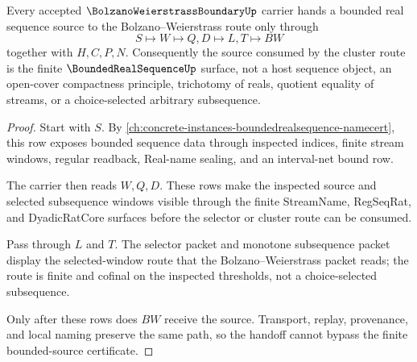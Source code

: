 \begin{theorem}
\label{thm:bolzano-weierstrass-boundary-source-handoff}
Every accepted $\BolzanoWeierstrassBoundaryUp$ carrier hands a bounded real sequence source to the Bolzano--Weierstrass route only through
$$
S\longmapsto W\longmapsto Q,D\longmapsto L,T\longmapsto BW
$$
together with $H,C,P,N$. Consequently the source consumed by the cluster route is the finite $\BoundedRealSequenceUp$ surface, not a host sequence object, an open-cover compactness principle, trichotomy of reals, quotient equality of streams, or a choice-selected arbitrary subsequence.
\end{theorem}
\begin{proof}
Start with $S$. By \autoref{ch:concrete-instances-boundedrealsequence-namecert}, this row exposes bounded sequence data through inspected indices, finite stream windows, regular readback, Real-name sealing, and an interval-net bound row.

The carrier then reads $W,Q,D$. These rows make the inspected source and selected subsequence windows visible through the finite StreamName, RegSeqRat, and DyadicRatCore surfaces before the selector or cluster route can be consumed.

Pass through $L$ and $T$. The selector packet and monotone subsequence packet display the selected-window route that the Bolzano--Weierstrass packet reads; the route is finite and cofinal on the inspected thresholds, not a choice-selected subsequence.

Only after these rows does $BW$ receive the source. Transport, replay, provenance, and local naming preserve the same path, so the handoff cannot bypass the finite bounded-source certificate.
\end{proof}

